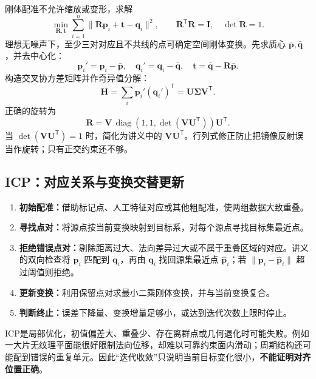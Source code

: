 刚体配准不允许缩放或变形，求解
\[
\min_{\mathbf R,\mathbf t}\sum_{i=1}^n
\|\mathbf R\mathbf p_i+\mathbf t-\mathbf q_i\|^2,
\qquad
\mathbf R^{\mathsf T}\mathbf R=\mathbf I,\quad \det\mathbf R=1.
\]
理想无噪声下，至少三对对应且不共线的点可确定空间刚体变换。先求质心 $\bar{\mathbf p},\bar{\mathbf q}$，并去中心化：
\[
\mathbf p_i'=\mathbf p_i-\bar{\mathbf p},\quad
\mathbf q_i'=\mathbf q_i-\bar{\mathbf q},\quad
\boxed{\mathbf t=\bar{\mathbf q}-\mathbf R\bar{\mathbf p}}.
\]
构造交叉协方差矩阵并作奇异值分解：
\[
\mathbf H=\sum_i\mathbf p_i'(\mathbf q_i')^{\mathsf T}
=\mathbf U\boldsymbol\Sigma\mathbf V^{\mathsf T}.
\]
正确的旋转为
\[
\boxed{\mathbf R=\mathbf V\,
\operatorname{diag}(1,1,\det(\mathbf V\mathbf U^{\mathsf T}))
\mathbf U^{\mathsf T}}.
\]
当 $\det(\mathbf V\mathbf U^{\mathsf T})=1$ 时，简化为讲义中的 $\mathbf V\mathbf U^{\mathsf T}$。行列式修正防止把镜像反射误当作旋转；只有正交约束还不够。

\subsection{ICP：对应关系与变换交替更新}
\begin{enumerate}
\item \textbf{初始配准：}借助标记点、人工特征对应或其他粗配准，使两组数据大致重叠。
\item \textbf{寻找点对：}将源点按当前变换映射到目标系，对每个源点寻找目标集最近点。
\item \textbf{拒绝错误点对：}剔除距离过大、法向差异过大或不属于重叠区域的对应。讲义的双向检查将 $\mathbf p_i$ 匹配到 $\mathbf q_i$，再由 $\mathbf q_i$ 找回源集最近点 $\widehat{\mathbf p}_i$；若 $\|\mathbf p_i-\widehat{\mathbf p}_i\|$ 超过阈值则拒绝。
\item \textbf{更新变换：}利用保留点对求最小二乘刚体变换，并与当前变换复合。
\item \textbf{判断终止：}误差下降量、变换增量足够小，或达到迭代次数上限时停止。
\end{enumerate}

ICP是局部优化，初值偏差大、重叠少、存在离群点或几何退化时可能失败。例如一大片无纹理平面能很好限制法向位移，却难以可靠约束面内滑动；周期结构还可能配到错误的重复单元。因此“迭代收敛”只说明当前目标变化很小，\textbf{不能证明对齐位置正确}。

